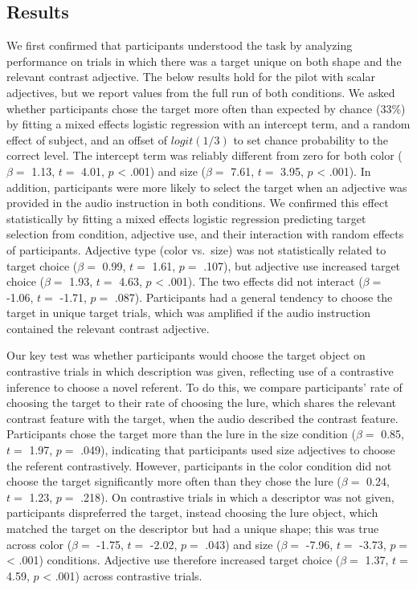\documentclass[10pt, letterpaper]{article}
\begin{document}
\subsection{Results}\label{results}

We first confirmed that participants understood the task by analyzing
performance on trials in which there was a target unique on both shape
and the relevant contrast adjective. The below results hold for the
pilot with scalar adjectives, but we report values from the full run of
both conditions. We asked whether participants chose the target more
often than expected by chance (\(33\%\)) by fitting a mixed effects
logistic regression with an intercept term, and a random effect of
subject, and an offset of \(logit(1/3)\) to set chance probability to
the correct level. The intercept term was reliably different from zero
for both color (\(\beta =\) 1.13, \(t =\) 4.01, \(p\) \textless{} .001)
and size (\(\beta =\) 7.61, \(t =\) 3.95, \(p\) \textless{} .001). In
addition, participants were more likely to select the target when an
adjective was provided in the audio instruction in both conditions. We
confirmed this effect statistically by fitting a mixed effects logistic
regression predicting target selection from condition, adjective use,
and their interaction with random effects of participants. Adjective
type (color vs.~size) was not statistically related to target choice
(\(\beta =\) 0.99, \(t =\) 1.61, \(p =\) .107), but adjective use
increased target choice (\(\beta =\) 1.93, \(t =\) 4.63, \(p\)
\textless{} .001). The two effects did not interact (\(\beta =\) -1.06,
\(t =\) -1.71, \(p =\) .087). Participants had a general tendency to
choose the target in unique target trials, which was amplified if the
audio instruction contained the relevant contrast adjective.

Our key test was whether participants would choose the target object on
contrastive trials in which description was given, reflecting use of a
contrastive inference to choose a novel referent. To do this, we compare
participants' rate of choosing the target to their rate of choosing the
lure, which shares the relevant contrast feature with the target, when
the audio described the contrast feature. Participants chose the target
more than the lure in the size condition (\(\beta =\) 0.85, \(t =\)
1.97, \(p =\) .049), indicating that participants used size adjectives
to choose the referent contrastively. However, participants in the color
condition did not choose the target significantly more often than they
chose the lure (\(\beta =\) 0.24, \(t =\) 1.23, \(p =\) .218). On
contrastive trials in which a descriptor was not given, participants
dispreferred the target, instead choosing the lure object, which matched
the target on the descriptor but had a unique shape; this was true
across color (\(\beta =\) -1.75, \(t =\) -2.02, \(p =\) .043) and size
(\(\beta =\) -7.96, \(t =\) -3.73, \(p =\) \textless{} .001) conditions.
Adjective use therefore increased target choice (\(\beta =\) 1.37,
\(t =\) 4.59, \(p\) \textless{} .001) across contrastive trials.
\end{document}
